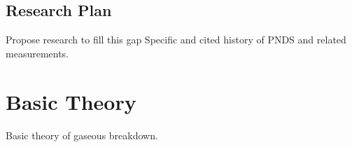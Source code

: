 \subsection{Research Plan}

Propose research to fill this gap
Specific and cited history of PNDS and related measurements.

\section{Basic Theory}

Basic theory of gaseous breakdown.
